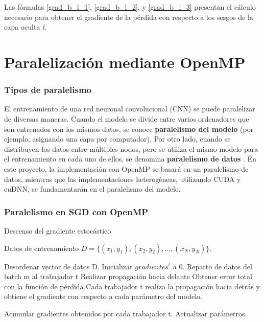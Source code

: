 Las fórmulas \ref{grad_b_l_1}, \ref{grad_b_l_2}, y \ref{grad_b_l_3} presentan el cálculo necesario para obtener el gradiente de la pérdida con respecto a los sesgos de la capa oculta \textit{l}.

\section{Paralelización mediante OpenMP}

\subsubsection{Tipos de paralelismo}

El entrenamiento de una red neuronal convolucional (CNN) se puede paralelizar de diversas maneras. Cuando el modelo se divide entre varios ordenadores que son entrenados con los mismos datos, se conoce \textbf{paralelismo del modelo} \cite{data_model_parallelism} (por ejemplo, asignando una capa por computador). Por otro lado, cuando se distribuyen los datos entre múltiples nodos, pero se utiliza el mismo modelo para el entrenamiento en cada uno de ellos, se denomina \textbf{paralelismo de datos} \cite{model_parallelism}. En este proyecto, la implementación con OpenMP se basará en un paralelismo de datos, mientras que las implementaciones heterogéneas, utilizando CUDA y cuDNN, se fundamentarán en el paralelismo del modelo. \\

\subsubsection{Paralelismo en SGD con OpenMP}
\begin{algorithm}[H]
	\caption{Descenso del gradiente estocástico} 
	\begin{algorithmic}
		\State Datos de entrenamiento $D=\{(x_1, y_1), (x_2, y_2), ..., (x_N, y_N)\}$.
		
			\State Desordenar vector de datos D.
					\State Inicializar $gradientes^t$ a 0.
					\State Reparto de datos del batch m al trabajador t
					\State Realizar propagación hacia delante
					\State Obtener error total con la función de pérdida
					\State Cada trabajador t realiza la propagación hacia 
					\State detrás y obtiene el gradiente con respecto a 
					\State cada parámetro del modelo.
					
					\State Acumular gradientes obtenidos por cada trabajador t.
					\State Actualizar parámetros.
					
				\EndFor
			\EndFor
		\EndFor
	\end{algorithmic}
\end{algorithm}

